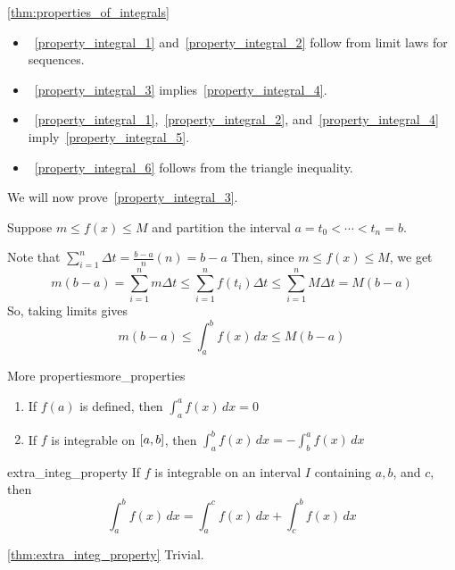 \begin{Proof}{\ref{thm:properties_of_integrals}}{}
    \begin{itemize}
        \item~\ref{property_integral_1} and~\ref{property_integral_2} follow from limit laws
              for sequences.
        \item~\ref{property_integral_3} implies~\ref{property_integral_4}.
        \item~\ref{property_integral_1},~\ref{property_integral_2},
              and~\ref{property_integral_4} imply~\ref{property_integral_5}.
        \item~\ref{property_integral_6} follows from the triangle inequality.
    \end{itemize}

    We will now prove~\ref{property_integral_3}.

    Suppose $ m\le f(x)\le M $ and partition the interval
    $ a=t_0<\cdots<t_n=b $.

    Note that
    $ \displaystyle\sum\limits_{i=1}^{n} \Delta t=\frac{b-a}{n}(n)=b-a $
    Then, since $ m\le f(x)\le M $, we get
    \[ m(b-a)=\sum\limits_{i=1}^{n} m\Delta t\le \sum\limits_{i=1}^{n} f(t_i)\Delta t
        \le \sum\limits_{i=1}^{n} M\Delta t=M(b-a) \]
    So, taking limits gives
    \[ m(b-a)\le \int_{a}^{b} f(x)\,d{x} \le M(b-a) \]
\end{Proof}

\begin{Definition}{More properties}{more_properties}
    \begin{enumerate}[label=(\Roman*)]
        \item If $ f(a) $ is defined, then
              $ \displaystyle\int_{a}^{a} f(x)\, d{x} =0 $
        \item If $ f $ is integrable on $ \interval{a}{b} $, then
              $ \displaystyle\int_{a}^{b} f(x)\, d{x}=-\int_{b}^{a} f(x)\, d{x} $
    \end{enumerate}
\end{Definition}

\begin{Theorem}{}{extra_integ_property}
    If $ f $ is integrable on an interval $ I $ containing $ a,b $, and $ c $, then
    \[ \int_{a}^{b} f(x)\, d{x}=\int_{a}^{c} f(x)\, d{x}+\int_{c}^{b} f(x)\, d{x} \]
\end{Theorem}

\begin{Proof}{\ref{thm:extra_integ_property}}{}
    Trivial.
\end{Proof}

